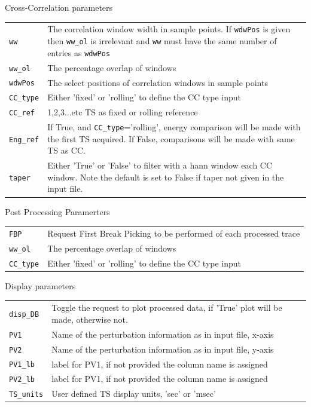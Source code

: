 \documentclass{article}
\begin{document}
Cross-Correlation parameters\newline
\begin{tabular}{l|p{120mm}}
\texttt{ww} & The correlation window width in sample points. If  \texttt{wdwPos} is given then \texttt{ww\_ol} is irrelevant and \texttt{ww} must have the same number of entries as \texttt{wdwPos}\\
\texttt{ww\_ol} & The percentage overlap of windows\\
\texttt{wdwPos} & The select positions of correlation windows in sample points\\
\texttt{CC\_type} & Either 'fixed' or 'rolling' to define the CC type input\\
\texttt{CC\_ref} & 1,2,3...etc TS as fixed or rolling reference\\
\texttt{Eng\_ref} & If True, and \texttt{CC\_type}='rolling', energy comparison will be made with the first TS acquired. If False, comparisons will be made with same TS as CC.  \\
\texttt{taper} & Either 'True' or 'False' to filter with a hann window each CC window. Note the default is set to False if taper not given in the input file.\\
\end{tabular}
\newline

Post Processing Paramerters\newline
\begin{tabular}{l|p{120mm}}
\texttt{FBP} & Request First Break Picking to be performed of each processed trace\\
\texttt{ww\_ol} & The percentage overlap of windows\\
\texttt{CC\_type} & Either 'fixed' or 'rolling' to define the CC type input\\
\end{tabular}
\newline

Display parameters\newline
\begin{tabular}{l|p{120mm}}
\texttt{disp\_DB} & Toggle the request to plot processed data, if 'True' plot will be made, otherwise not.\\
\texttt{PV1} & Name of the perturbation information as in input file, x-axis\\
\texttt{PV2} & Name of the perturbation information as in input file, y-axis\\
\texttt{PV1\_lb} & label for PV1, if not provided the column name is assigned\\
\texttt{PV2\_lb} & label for PV1, if not provided the column name is assigned\\
\texttt{TS\_units} & User defined TS display units, 'sec' or 'msec'\\
\end{tabular} 
\end{document}
